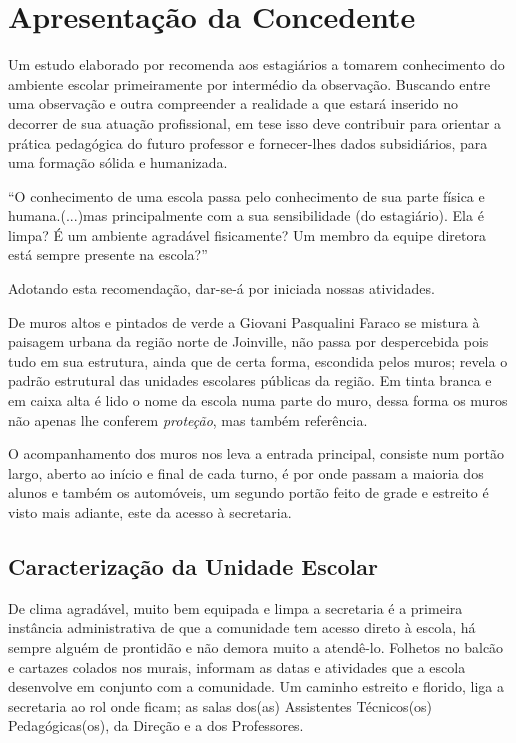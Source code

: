 \chapter{Apresentação da Concedente}
\label{cap: aprConcedente}

Um estudo elaborado por \cite{CARVALHOAMP:2012a} recomenda aos estagiários a tomarem conhecimento do ambiente escolar primeiramente por intermédio da observação. Buscando entre uma observação e outra compreender a realidade a que estará inserido no decorrer de sua atuação profissional, em tese isso deve contribuir para orientar a prática pedagógica do futuro professor e fornecer-lhes dados subsidiários, para uma formação sólida e humanizada.
\begin{citacao}
``O conhecimento de uma escola passa pelo conhecimento de sua parte física e humana.(...)mas principalmente com a sua sensibilidade (do estagiário). Ela é limpa? É um ambiente agradável fisicamente? Um membro da equipe diretora está sempre presente na escola?'' 
\end{citacao}
Adotando esta recomendação, dar-se-á por iniciada nossas atividades.

De muros altos e pintados de verde a Giovani Pasqualini Faraco se mistura à paisagem urbana da região norte de Joinville, não passa por despercebida pois tudo em sua estrutura, ainda que de certa forma, escondida pelos muros; revela o padrão estrutural das unidades escolares públicas da região. Em tinta branca e em caixa alta é lido o nome da escola numa parte do muro, dessa forma os muros não apenas lhe conferem \emph{proteção}, mas também referência.

O acompanhamento dos muros nos leva a entrada principal, consiste num portão largo, aberto ao início e final de cada turno, é por onde passam a maioria dos alunos e também os automóveis, um segundo portão feito de grade e estreito é visto mais adiante, este da acesso à secretaria.

\section{Caracterização da Unidade Escolar}
De clima agradável, muito bem equipada e limpa a secretaria é a primeira instância administrativa de que a comunidade tem acesso direto à escola, há sempre alguém de prontidão e não demora muito a atendê-lo. Folhetos no balcão e cartazes colados nos murais, informam as datas e atividades que a escola desenvolve em conjunto com a comunidade. Um caminho estreito e florido, liga a secretaria ao rol onde ficam; as salas dos(as) Assistentes Técnicos(os) Pedagógicas(os), da Direção e a dos Professores.


